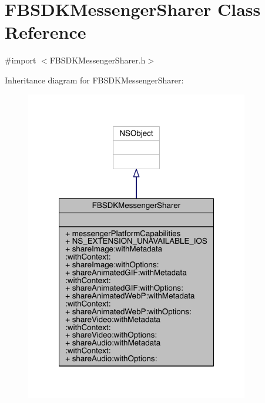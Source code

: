 \hypertarget{interface_f_b_s_d_k_messenger_sharer}{\section{F\-B\-S\-D\-K\-Messenger\-Sharer Class Reference}
\label{interface_f_b_s_d_k_messenger_sharer}
}


{\ttfamily \#import $<$F\-B\-S\-D\-K\-Messenger\-Sharer.\-h$>$}



Inheritance diagram for F\-B\-S\-D\-K\-Messenger\-Sharer\-:
\nopagebreak
\begin{figure}[H]
\begin{center}
\leavevmode
\includegraphics[width=276pt]{interface_f_b_s_d_k_messenger_sharer__inherit__graph}
\end{center}
\end{figure}


